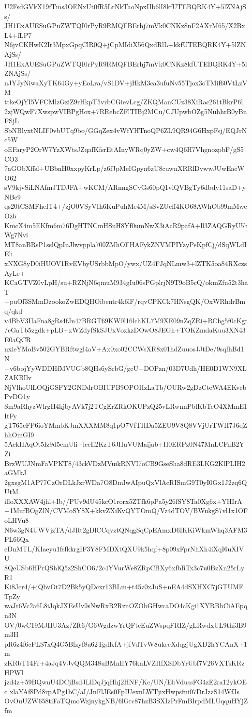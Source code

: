 U2FsdGVkX19fTms3OENxUt0fR5LrNkTaoNpxIIb6lI8kfUTEBQRK4Y+5lZNAjSs/
JH1ExAUESuGPuZWTQI0rPyR9RMQFBErhj7mVk0CNKz8nF2AXrM65/X2BxL4+fLP7
N6jvCKHwK2Ir3MpxGpqClR0Q+jCpMIdiX56QxdRlL+kkfUTEBQRK4Y+5lZNAjSs/
JH1ExAUESuGPuZWTQI0rPyR9RMQFBErhj7mVk0CNKz8kfUTEBQRK4Y+5lZNAjSs/
nJYJyNiwaXyTK64Gy+yEoLra/vS1DV+jHkM3ca3ufuNv55Tjox3oTMif60VtLzVM
ttkeOjYI5VFCMlzGziZ9rHkpT5vrbCGievLcg/ZKQManCUz38XiRac261tBkrP6l
2zjWQwF7XwspwVIBPgHox+7RRebcZFlTIBj2MCu/CJUpwbOZg5NuhhrB0yBnFSjL
SbNBlyxtNLIF0vbUTq9bo/GGqZex4vWfYHTnoQP6ZL9QR94G6HxpFsj/EQJrNc5W
oEFaryP2OrW7YzXWtsJZqafKfsrEtAInyWRq0yZW+cw4Q6H7VhgnozpbF/gS5CO3
7aGObXffsl+UBbnH0xxpyKrLp/z6fJpMeIGpyn6zU8cuwnXRRlDvwwJUwEaeWO62
sV9kjvSiLNAfmJTDJFA+wKCM/ARnngSCvGs60pQ1vlQVBgTy6dbdy11saD+yNBc9
qs20tCSMFheIT4+/zjO0VSyVIh6KuPuhMe4M/sSvZUcff4KO68AWhOb99mMweOzb
KmcX4m5EKfm6m76DgHTNCmHSuH8Yf0umNwX3iAcR9pafA+ll3ZAQGRyU5hWg7Nvi
MT8anBRsP1sslQpIuJlwvppla700ZMhOFHAFykZNVMPIYzyPsKpfCj/dSqWLdIEh
xNXG8yD0iHUOV1RvEVbyUSrbbMpO/ywx/UZ4FJqNLmw3+lZTK5oa84RXczsAyLe+
KCaGTVZ0vLpH/su+RZNjN6qmuM934gIu06sPGplrjN9T9oB5cQ/okmZfn52t3haT
+puOf3SMmDzookoZwEDQHOibentr4k6lF/rqvCPKCk7HNsgQK/OxWRhdrBmq/qkd
v4BbV3IIaFna8gRs4fJn47BRGT69KW0l16lchKL7M9XE09nZqZRi+RChg5f0cKgt
/cGaTb5zgdk+pLB+xWZdyfSkSJUxVoxkzDOwO8JEGh+TOKZmdaKuu3XN43E0aQCR
nxieYMoBv502GYBRftwgl4aV+Ax0xo02CCWsXR8x01hdZuuosJJtDe/9sqfhBd1N
+v6bojYyWDDHfMVUGb8QHs6ySrbG/geU+DOPzn/03D7Udh/HE0D1WN9XLZAKBIlv
NjVlhoUlLOQjGSFY2GNDdrOBIUPB9OPOHzLaTb/OURw2gDzCteWA4EKvcbPvDO1y
Sm9aRhyzWlrgH4kjbyAVk7j2TCgErZRkOKUPzQ25vLRwnnPblKbTcO4XMmE1ItFy
gT765cFP6ioYMmbKJmXXXMM8q1pO7VfTHDa5ZEU9V8Q8VVjUrTWH7J6qZhhOmGI9
5AekHAqOt5Iz9d5emUli+lceIi2KzT6JHuVUMaijab+H0ERPz0N47MnLCFnB2YZi
BrzWUJNmFaVPKT8/43ckVDzMVuikRNVI7oCB9GseSha8dRE3LKG2KlPLIH2aGMkJ
2gxsgM1AP77CzOrDLkJzrWDa7O8DmIwAIpuQxVlAcRISmG9T0yI0Gx1J2zq6QUtM
illoXXXAW4jhl+Ib//PUv9dU45kcO1rorx5ZTfk6pPa5y26fSY8Ta0Xg6x+YHIrA
+1MufBOgZlN/CVMoSY8X+kkvZXiKvQYTOmQ/Vz4dTOV/BWukgS7vl1x1OFoLHVu8
N6w3gN4UWVjzTA/dJRt2gDlCCqvztQNqgSqCpEAmxD6IKKiWkmWhq3AFM3PL66Qx
eDnMTL/KIaeyu1fsfkkrgIF3Y8FMDXtQXU9k5hqf+8p09xFprNhXh4iXqI6uXIVU
8QeUSb6HPrQShlQ5z2ShCO6/2c4YVurWe8ZRpCBXy6xfbRTx3c7u0BzXn25rLyR1
Ki8Jcr4/+iQbvOt7D2Bk5yQDcxr13BLm+t45z0xJuS+nEA4dSXHXC7jGTUMFTpZy
waJr6Vc2a6L8iJqkJXEsUv9sNwRxR2RznOZObGHwcaDO4cKgi1XYRBhCiAEpqn3N
OV/0wC19MJHU3Az/Zft6/G6WgdzwYrQFtcEuZWspqFRIZ/gLRwdxUL9thi3B9m3H
pR6z4f6cPLS7xQ4G5Bfzyf8u62TgdKfA+jfVdTvW8ukecXdqgjUgXD2hYCAnX+1m
zKRbT14Fr+4aJq4VJvQQM348uBMnIlY76knLVZHfXSDbYrUbf7V26VXTsKRzHPWI
jzd4z+59BQwuU4DCjBsdJLlDqJjqHhj2HNF/Kc/UN/EbVdussFG4zE2ra12ykOEc
xlaYAf8Pd8rpAPg1bC/aI/JnFlJEs0FpIUexnLWTjixHwpsfni07DrJzzS14WfJs
OvOuUZW658tiFaTQmoWzjnykgNB/6lGrc87hzB3SXIzPrFmBIrpdMLUqquHYjZfm
